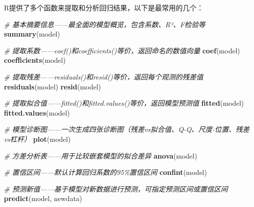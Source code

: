 \documentclass[
  twoside,12pt,fontset=none]{ctexbook}
\newenvironment{Shaded}{\begin{snugshade}}{\end{snugshade}}
\newcommand{\AttributeTok}[1]{\textcolor[rgb]{0.13,0.29,0.53}{#1}}
\newcommand{\CommentTok}[1]{\textcolor[rgb]{0.56,0.35,0.01}{\textit{#1}}}
\newcommand{\ConstantTok}[1]{\textcolor[rgb]{0.56,0.35,0.01}{#1}}
\newcommand{\FunctionTok}[1]{\textcolor[rgb]{0.13,0.29,0.53}{\textbf{#1}}}
\newcommand{\NormalTok}[1]{#1}
\newcommand{\OtherTok}[1]{\textcolor[rgb]{0.56,0.35,0.01}{#1}}
\newcommand{\SpecialCharTok}[1]{\textcolor[rgb]{0.81,0.36,0.00}{\textbf{#1}}}
\newcommand{\StringTok}[1]{\textcolor[rgb]{0.31,0.60,0.02}{#1}}
\begin{document}
R提供了多个函数来提取和分析回归结果，以下是最常用的几个：

\begin{Shaded}
\begin{Highlighting}[]
\CommentTok{\# 基本摘要信息——最全面的模型概览，包含系数、R²、F检验等}
\FunctionTok{summary}\NormalTok{(model)}

\CommentTok{\# 提取系数——coef()和coefficients()等价，返回命名的数值向量}
\FunctionTok{coef}\NormalTok{(model)}
\FunctionTok{coefficients}\NormalTok{(model)}

\CommentTok{\# 提取残差——residuals()和resid()等价，返回每个观测的残差值}
\FunctionTok{residuals}\NormalTok{(model)}
\FunctionTok{resid}\NormalTok{(model)}

\CommentTok{\# 提取拟合值——fitted()和fitted.values()等价，返回模型预测值}
\FunctionTok{fitted}\NormalTok{(model)}
\FunctionTok{fitted.values}\NormalTok{(model)}

\CommentTok{\# 模型诊断图——一次生成四张诊断图（残差vs拟合值、Q{-}Q、尺度{-}位置、残差vs杠杆）}
\FunctionTok{plot}\NormalTok{(model)}

\CommentTok{\# 方差分析表——用于比较嵌套模型的拟合差异}
\FunctionTok{anova}\NormalTok{(model)}

\CommentTok{\# 置信区间——默认计算回归系数的95\%置信区间}
\FunctionTok{confint}\NormalTok{(model)}

\CommentTok{\# 预测新值——基于模型对新数据进行预测，可指定预测区间或置信区间}
\FunctionTok{predict}\NormalTok{(model, newdata)}
\end{Highlighting}
\end{Shaded}

\begin{Shaded}
\end{Shaded}
\end{document}
